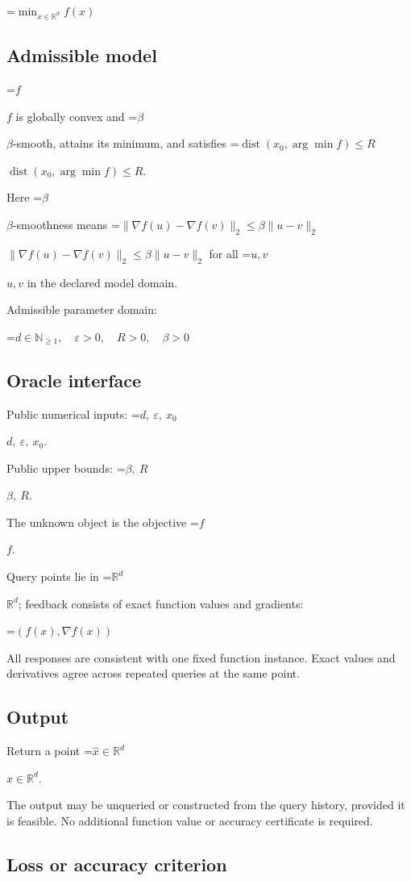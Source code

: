 \documentclass[10pt,a4paper]{article}
\newcommand{\AtlasMath}[1]{\par\begingroup\centering\setbox0=\hbox{$\displaystyle #1$}\ifdim\wd0>1.4\linewidth\typeout{ATLAS WIDE FORMULA: \the\wd0}\fi\ifdim\wd0>\linewidth\resizebox{\linewidth}{!}{\box0}\else\box0\fi\par\endgroup}
\newcommand{\AtlasInlineMath}[1]{\begingroup\setbox0=\hbox{$#1$}\ifdim\wd0>.4\linewidth\endgroup\AtlasMath{#1}\else\endgroup$#1$\fi}
\begin{document}
\AtlasMath{\min_{x\in \mathbb{R}^d}f(x)}


\subsection{Admissible model}
\AtlasInlineMath{f} is globally convex and \AtlasInlineMath{\beta}-smooth, attains its minimum, and satisfies \AtlasInlineMath{\operatorname{dist}(x_0,\arg\min f)\le R}.

Here \AtlasInlineMath{\beta}-smoothness means \AtlasInlineMath{\|\nabla f(u)-\nabla f(v)\|_2\le\beta\|u-v\|_2} for all \AtlasInlineMath{u,v} in the declared model domain.

Admissible parameter domain:


\AtlasMath{d\in\mathbb{N}_{\ge1},\quad \varepsilon>0,\quad R>0,\quad \beta>0}


\subsection{Oracle interface}
Public numerical inputs: \AtlasInlineMath{d,\ \varepsilon,\ x_0}.

Public upper bounds: \AtlasInlineMath{\beta,\ R}.

The unknown object is the objective \AtlasInlineMath{f}.

Query points lie in \AtlasInlineMath{\mathbb{R}^d}; feedback consists of exact function values and gradients:


\AtlasMath{(f(x),\nabla f(x))}


All responses are consistent with one fixed function instance. Exact values and derivatives agree across repeated queries at the same point.

\subsection{Output}
Return a point \AtlasInlineMath{\widehat x\in\mathbb R^d}.

The output may be unqueried or constructed from the query history, provided it is feasible. No additional function value or accuracy certificate is required.

\subsection{Loss or accuracy criterion}
\end{document}
